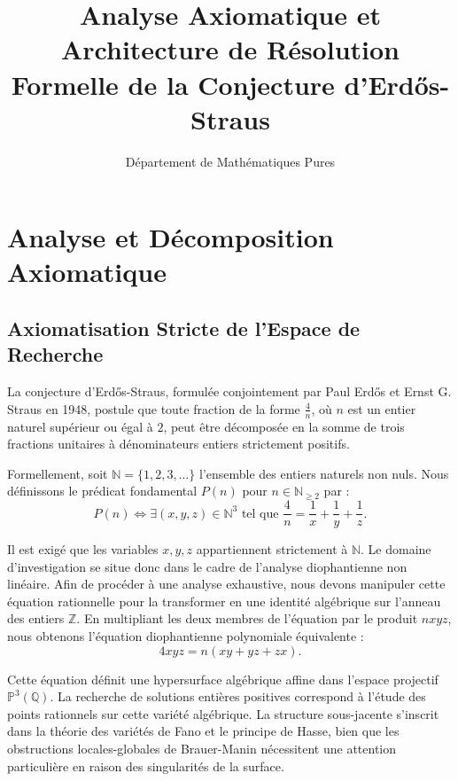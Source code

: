 \documentclass[12pt, a4paper]{article}
\title{\textbf{Analyse Axiomatique et Architecture de Résolution Formelle de la Conjecture d'Erd\H{o}s-Straus}}
\author{Département de Mathématiques Pures}
\date{}
\begin{document}
\maketitle
\tableofcontents
\newpage

\section{Analyse et Décomposition Axiomatique}
\subsection{Axiomatisation Stricte de l'Espace de Recherche}
La conjecture d'Erd\H{o}s-Straus, formulée conjointement par Paul Erd\H{o}s et Ernst G. Straus en 1948, postule que toute fraction de la forme $\frac{4}{n}$, où $n$ est un entier naturel supérieur ou égal à $2$, peut être décomposée en la somme de trois fractions unitaires à dénominateurs entiers strictement positifs.

Formellement, soit $\mathbb{N} = \{1, 2, 3, \ldots\}$ l'ensemble des entiers naturels non nuls. Nous définissons le prédicat fondamental $P(n)$ pour $n \in \mathbb{N}_{\ge 2}$ par :
\begin{equation}
P(n) \iff \exists (x, y, z) \in \mathbb{N}^3 \text{ tel que } \frac{4}{n} = \frac{1}{x} + \frac{1}{y} + \frac{1}{z}.
\end{equation}

Il est exigé que les variables $x, y, z$ appartiennent strictement à $\mathbb{N}$. Le domaine d'investigation se situe donc dans le cadre de l'analyse diophantienne non linéaire.
Afin de procéder à une analyse exhaustive, nous devons manipuler cette équation rationnelle pour la transformer en une identité algébrique sur l'anneau des entiers $\mathbb{Z}$. En multipliant les deux membres de l'équation par le produit $nxyz$, nous obtenons l'équation diophantienne polynomiale équivalente :
\begin{equation}
4xyz = n(xy + yz + zx).
\end{equation}

Cette équation définit une hypersurface algébrique affine dans l'espace projectif $\mathbb{P}^3(\mathbb{Q})$. La recherche de solutions entières positives correspond à l'étude des points rationnels sur cette variété algébrique. La structure sous-jacente s'inscrit dans la théorie des variétés de Fano et le principe de Hasse, bien que les obstructions locales-globales de Brauer-Manin nécessitent une attention particulière en raison des singularités de la surface.
\end{document}
